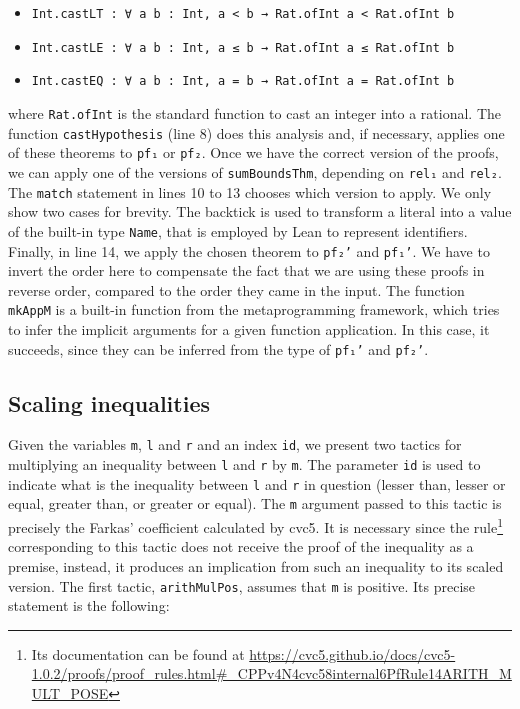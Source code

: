 \begin{itemize}
  \item \texttt{Int.castLT : ∀ {a b : Int}, a < b → Rat.ofInt a < Rat.ofInt b}
  \item \texttt{Int.castLE : ∀ {a b : Int}, a ≤ b → Rat.ofInt a ≤ Rat.ofInt b}
  \item \texttt{Int.castEQ : ∀ {a b : Int}, a = b → Rat.ofInt a = Rat.ofInt b}
\end{itemize}
where \texttt{Rat.ofInt} is the standard function to cast an integer into a rational.
The function \texttt{castHypothesis} (line 8) does this analysis and, if necessary,
applies one of these theorems to \texttt{pf₁} or \texttt{pf₂}.
Once we have the correct version of the proofs, we can apply one of the versions of
\texttt{sumBoundsThm}, depending on \texttt{rel₁} and \texttt{rel₂}. The \texttt{match}
statement in lines 10 to 13 chooses which version to apply. We only show two cases
for brevity. The backtick is used to transform a literal into a value of the built-in type
\texttt{Name}, that is employed by Lean to represent identifiers. Finally, in line 14, we apply the
chosen theorem to \texttt{pf₂'} and \texttt{pf₁'}. We have to invert the order here to compensate the fact that we are using these proofs in reverse order, compared to
the order they came in the input. The function \texttt{mkAppM} is a built-in function
from the metaprogramming framework, which tries to infer the implicit arguments for a
given function application. In this case, it succeeds, since they can be inferred
from the type of \texttt{pf₁'} and \texttt{pf₂'}.

\subsection{Scaling inequalities}

Given the variables \texttt{m}, \texttt{l} and \texttt{r} and an index \texttt{id},
we present two tactics for multiplying an inequality between \texttt{l} and \texttt{r}
by \texttt{m}. The parameter \texttt{id} is used to indicate what is the inequality
between \texttt{l} and \texttt{r} in question (lesser than, lesser or equal, greater
than, or greater or equal).
%
The \texttt{m} argument passed to this tactic is precisely the Farkas'
coefficient calculated by cvc5.
%
It is necessary since the rule\footnote{Its documentation can be found at
\url{https://cvc5.github.io/docs/cvc5-1.0.2/proofs/proof\_rules.html\#\_CPPv4N4cvc58internal6PfRule14ARITH\_MULT\_POSE}}
corresponding to this tactic does not receive the proof of the inequality
as a premise, instead, it produces an implication from such an inequality to its
scaled version.
%
The first tactic, \texttt{arithMulPos}, assumes that \texttt{m} is positive.
%
Its precise statement is the following:

